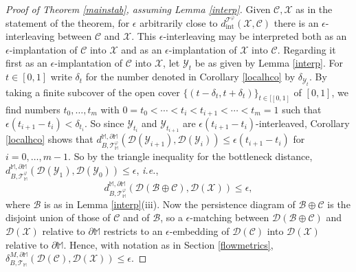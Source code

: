 \documentclass[11pt]{amsart}
\theoremstyle{definition}
\theoremstyle{remark}
\numberwithin{equation}{section}
\def\ep{\epsilon}
\begin{document}
\begin{proof}[Proof of Theorem \ref{mainstab}, assuming Lemma \ref{interp}] Given $\mathcal{C},\mathcal{X}$ as in the statement of the theorem, for $\ep$ arbitrarily close to $d_{\mathrm{int}}^{\mathcal{T}^{\varphi}}(\mathcal{X},\mathcal{C})$ there is an $\ep$-interleaving between $\mathcal{C}$ and $\mathcal{X}$.  This $\ep$-interleaving may be interpreted both as an $\ep$-implantation of $\mathcal{C}$ into $\mathcal{X}$ and as an $\ep$-implantation of $\mathcal{X}$ into $\mathcal{C}$.  Regarding it first as an $\ep$-implantation of $\mathcal{C}$ into $\mathcal{X}$, let $\mathcal{Y}_t$ be as given by Lemma \ref{interp}. For $t\in [0,1]$ write $\delta_t$ for the number denoted in Corollary \ref{localhco} by $\delta_{\mathcal{Y}_t}$.  By taking a finite subcover of the open cover $\{(t-\delta_t,t+\delta_t)\}_{t\in [[0,1]}$ of $[0,1]$, we find numbers $t_0,\ldots,t_m$ with $0=t_0<\cdots<t_i<t_{i+1}<\cdots<t_m=1$ such that $\ep(t_{i+1}-t_i)<\delta_{t_i}$.  So since $\mathcal{Y}_{t_i}$ and $\mathcal{Y}_{t_{i+1}}$ are $\ep(t_{i+1}-t_i)$-interleaved, Corollary \ref{localhco} shows that $d_{B,\mathcal{T}_{\mathbb{M}}^{\varphi}}^{\mathbb{M},\partial\mathbb{M}}(\mathcal{D}(\mathcal{Y}_{i+1}),\mathcal{D}(\mathcal{Y}_i))\leq \ep(t_{i+1}-t_i)$ for $i=0,\ldots,m-1$.  So by the triangle inequality for the bottleneck distance, $d_{B,\mathcal{T}_{\mathbb{M}}^{\varphi}}^{\mathbb{M},\partial\mathbb{M}}(\mathcal{D}(\mathcal{Y}_{1}),\mathcal{D}(\mathcal{Y}_0))\leq \ep$, \emph{i.e.},
 \[  d_{B,\mathcal{T}_{\mathbb{M}}^{\varphi}}^{\mathbb{M},\partial\mathbb{M}}\left(\mathcal{D}(\mathcal{B}\oplus\mathcal{C}),\mathcal{D}(\mathcal{X})\right)\leq \ep,\] where $\mathcal{B}$ is as in Lemma \ref{interp}(iii).  Now the persistence diagram of $\mathcal{B}\oplus\mathcal{C}$ is the disjoint union of those of $\mathcal{C}$ and of $\mathcal{B}$, so a $\ep$-matching between  $\mathcal{D}(\mathcal{B}\oplus\mathcal{C})$ and $\mathcal{D}(\mathcal{X})$ relative to $\partial\mathbb{M}$ restricts to an $\ep$-embedding of $\mathcal{D}(\mathcal{C})$ into $\mathcal{D}(\mathcal{X})$ relative to $\partial \mathbb{M}$.  Hence, with notation as in Section \ref{flowmetrics}, $\delta_{B,\mathcal{T}_{\mathbb{M}}}^{M,\partial\mathbb{M}}(\mathcal{D}(\mathcal{C}),\mathcal{D}(\mathcal{X}))\leq \ep$. %


\end{proof}
\end{document}
